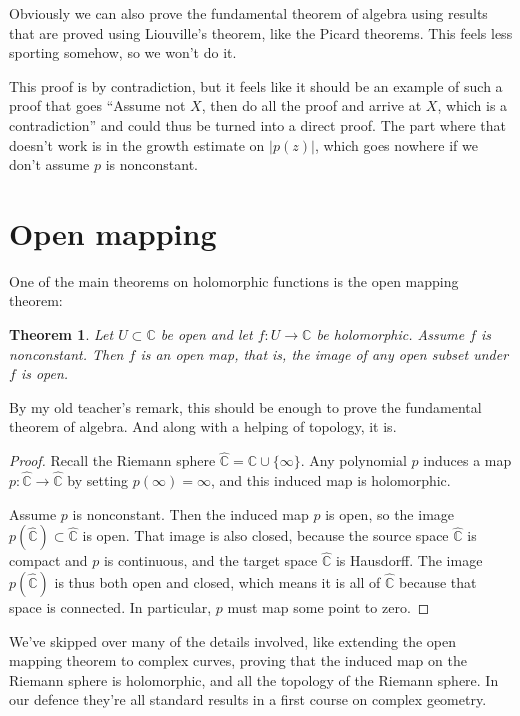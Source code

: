 \documentclass[11pt,draft]{article}
\newtheorem*{theo}{Theorem}
\newcommand{\kk}[1]{\mathbb{#1}}
\begin{document}
Obviously we can also prove the fundamental theorem of algebra using results
that are proved using Liouville's theorem, like the Picard theorems. This feels
less sporting somehow, so we won't do it.

This proof is by contradiction, but it feels like it should be an example of
such a proof that goes ``Assume not $X$, then do all the proof and arrive at
$X$, which is a contradiction'' and could thus be turned into a direct proof.
The part where that doesn't work is in the growth estimate on $|p(z)|$, which
goes nowhere if we don't assume $p$ is nonconstant.




\section{Open mapping}

One of the main theorems on holomorphic functions is the open mapping theorem:

\begin{theo}
Let $U \subset \kk C$ be open and let $f : U \to \kk C$ be holomorphic.
Assume $f$ is nonconstant.
Then $f$ is an open map, that is, the image of any open subset under $f$ is open.
\end{theo}

By my old teacher's remark, this should be enough to prove the fundamental theorem of algebra.
And along with a helping of topology, it is.

\begin{proof}
Recall the Riemann sphere $\widehat{\kk C} = \kk C \cup \{\infty\}$.
Any polynomial $p$ induces a map $p : \widehat{\kk C} \to \widehat{\kk C}$ by setting $p(\infty) = \infty$,
and this induced map is holomorphic.

Assume $p$ is nonconstant.
Then the induced map $p$ is open, so the image $p(\widehat{\kk C}) \subset \widehat{\kk C}$ is open.
That image is also closed, because the source space $\widehat{\kk C}$ is compact and $p$ is
continuous, and the target space $\widehat{\kk C}$ is Hausdorff.
The image $p(\widehat{\kk C})$ is thus both open and closed, which means it is
all of $\widehat{\kk C}$ because that space is connected.
In particular, $p$ must map some point to zero.
\end{proof}

We've skipped over many of the details involved, like extending the open mapping
theorem to complex curves, proving that the induced map on the Riemann sphere is
holomorphic, and all the topology of the Riemann sphere. In our defence they're
all standard results in a first course on complex geometry.
\end{document}
